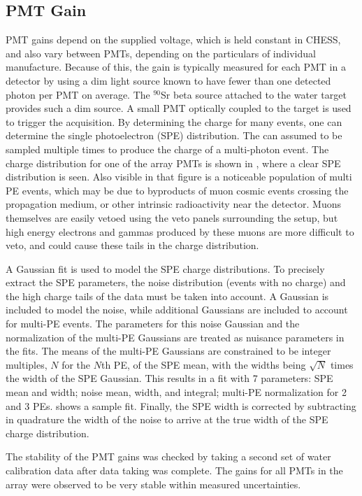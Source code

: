 \subsection{PMT Gain}
\label{pmt-gain}
PMT gains depend on the supplied voltage, which is held constant in CHESS, and also vary between PMTs, depending on the particulars of individual manufacture.
Because of this, the gain is typically measured for each PMT in a detector by using a dim light source known to have fewer than one detected photon per PMT on average.
The $^{90}$Sr beta source attached to the water target provides such a dim source.
A small PMT optically coupled to the target is used to trigger the acquisition. 
By determining the charge for many events, one can determine the single photoelectron (SPE) distribution.
The  can assumed to be sampled multiple times to produce the charge of a multi-photon event.
The charge distribution for one of the array PMTs  is shown in , where a clear SPE distribution is seen. 
Also visible in that figure is a noticeable population of multi PE events, which may be due to byproducts of muon cosmic events crossing the propagation medium, or other intrinsic radioactivity near the detector. 
Muons themselves are easily vetoed using the veto panels surrounding the setup, but high energy electrons and gammas produced by these muons are more difficult to veto, and could cause these tails in the charge distribution. 

A Gaussian fit is used to model the SPE charge distributions. 
To precisely extract the SPE parameters, the noise distribution (events with no charge) and the high charge tails of the data must be taken into account.
A Gaussian is included to model the noise, while additional Gaussians are included to account for multi-PE events. 
The parameters for this noise Gaussian and the normalization of the multi-PE Gaussians are treated as nuisance parameters in the fits.
The means of the multi-PE Gaussians are constrained to be integer multiples, $N$ for the $N$th PE, of the SPE mean, with the widths being $\sqrt{N}$ times the width of the SPE Gaussian.
This results in a fit with 7 parameters: SPE mean and width; noise mean, width, and integral; multi-PE normalization for 2 and 3 PEs.
 shows a sample fit.
Finally, the SPE width is corrected by subtracting in quadrature the width of the noise to arrive at the true width of the SPE charge distribution.

The stability of the PMT gains was checked by taking a second set of water calibration data after data taking was complete.  
The gains for all PMTs in the array were observed to be very stable within measured uncertainties.

